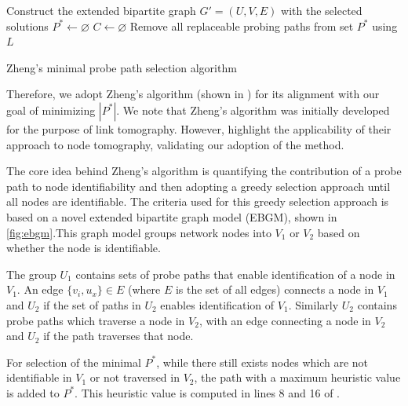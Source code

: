 \begin{algorithm}[H]
    
    Construct the extended bipartite graph $G'=(U,V,E)$ with the selected solutions\;
    $P^* \gets \varnothing$ \;
    $C \gets \varnothing$ \;
    Remove all replaceable probing paths from set $P^*$ using $L$\;
    \caption{Zheng's minimal probe path selection algorithm}
    \label{alg:zhengs}
\end{algorithm}
\noindent Therefore, we adopt Zheng's algorithm (shown in ) for its alignment with our goal of minimizing $|P^*|$. We note that Zheng's algorithm was initially developed for the purpose of link tomography. However, \cite{zheng_minimizing_2013} highlight the applicability of their approach to node tomography, validating our adoption of the method.\par
The core idea behind Zheng's algorithm is quantifying the contribution of a probe path to node identifiability and then adopting a greedy selection approach until all nodes are identifiable. The criteria used for this greedy selection approach is based on a novel extended bipartite graph model (EBGM), shown in \cref{fig:ebgm}.This graph model groups network nodes into $V_1$ or $V_2$ based on whether the node is identifiable.\par
The group $U_1$ contains sets of probe paths that enable identification of a node in $V_1$. An edge $\{v_i, u_x\} \in E$ (where $E$ is the set of all edges) connects a node in $V_1$ and $U_2$ if the set of paths in $U_2$ enables identification of $V_1$. Similarly $U_2$ contains probe paths which traverse a node in $V_2$, with an edge connecting a node in $V_2$ and $U_2$ if the path traverses that node.\par
For selection of the minimal $P^*$, while there still exists nodes which are not identifiable in $V_1$ or not traversed in $V_2$, the path with a maximum heuristic value is added to $P^*$. This heuristic value is computed in lines 8 and 16 of .\par

